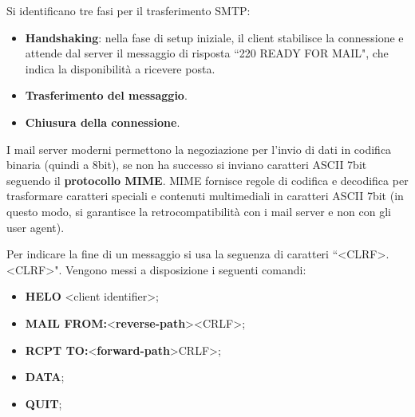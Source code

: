\documentclass[11pt, italian, openany]{book}
\begin{document}
\begin{sloppypar}
\begin{itemize}[topsep=0pt]
	Si identificano tre fasi per il trasferimento SMTP:
	\vspace{-3.5mm}
	\begin{itemize}
		\itemsep-0.3em
		\item \textbf{Handshaking}: nella fase di setup iniziale, il client stabilisce la connessione e attende dal server il messaggio di risposta
		``220 READY FOR MAIL", che indica la disponibilit\`a a ricevere posta.
		\item \textbf{Trasferimento del messaggio}.
		\item \textbf{Chiusura della connessione}.
	\end{itemize}

	I mail server moderni permettono la negoziazione per l'invio di dati in codifica binaria (quindi a 8bit), se non ha successo si inviano caratteri ASCII 7bit
	seguendo il \textbf{protocollo MIME}. MIME fornisce regole di codifica e decodifica per trasformare caratteri speciali e contenuti multimediali in caratteri
	ASCII 7bit (in questo modo, si garantisce la retrocompatibilit\`a con i mail server e non con gli user agent).

	Per indicare la fine di un messaggio si usa la seguenza di caratteri ``\textless{CLRF}\textgreater{.}\textless{CLRF}\textgreater{"}. Vengono messi a
	disposizione i seguenti comandi:
	\vspace{-3.5mm}
	\begin{itemize}
		\itemsep-0.3em
		\item \textbf{HELO} \textless{client identifier}\textgreater{;}
		\item \textbf{MAIL FROM:}\textless{\textbf{reverse-path}\textgreater{\textless{CRLF}\textgreater{;}}}
		\item \textbf{RCPT TO:}\textless{\textbf{forward-path}\textgreater{CRLF\textgreater{;}}}
		\item \textbf{DATA};
		\item \textbf{QUIT};
	\end{itemize}


\end{itemize}
\end{sloppypar}
\end{document}
